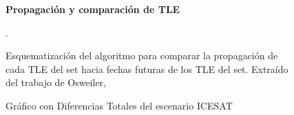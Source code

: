 \begin{figure}[!h]
\centering
  \textbf{Propagaci\'on y comparaci\'on de TLE }\par\medskip
  \caption{Esquematizaci\'on del algoritmo para comparar la propagaci\'on de cada TLE del set hacia fechas futuras de los TLE del set. Extra\'ido del trabajo de Osweiler, \citep{osweiler}}.
  \label{fig:todosOSW}
\end{figure}

\begin{figure}[h!]
\centering
  \caption{Gr\'afico con Diferencias Totales del escenario ICESAT}
  \label{fig:icesatTot}
\end{figure}

